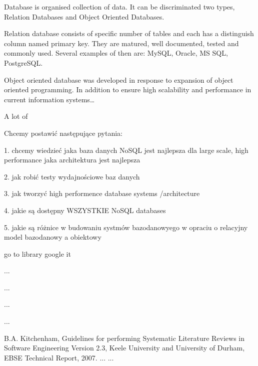 \documentclass[times, 10pt,twocolumn]{article}
\begin{document}


Database is organised collection of data. It can be discriminated two types, 
Relation Databases and Object Oriented Databases.

Relation database consists of specific number of tables and each has a distinguish column named primary key. 
They are matured, well documented, tested and commonly used. Several examples of then are: MySQL, Oracle, MS SQL, PostgreSQL. 

Object oriented database was developed in response to expansion of object oriented programming. In addition to ensure high scalability and  
performance in current information systems\ldots

A lot of 


Chcemy postawić następujące pytania:

1. chcemy wiedzieć jaka baza danych NoSQL jest najlepsza dla large scale, high performance
jaka architektura jest najlepsza

2. jak robić testy wydajnościowe baz danych

3. jak tworzyć high performence database systems /architecture

4. jakie są dostępny WSZYSTKIE NoSQL databases

5. jakie są różnice w budowaniu systmów bazodanowyego w opraciu o relacyjny model bazodanowy a obiektowy



go to library
google it


...


...



...


...

\noindent [1] B.A. Kitchenham, Guidelines for performing Systematic Literature Reviews in Software Engineering Version 2.3, Keele University and University of Durham, EBSE Technical Report, 2007. \newline
[2] ... \newline
[3] ...


\nocite{ex1,ex2}


\end{document}
